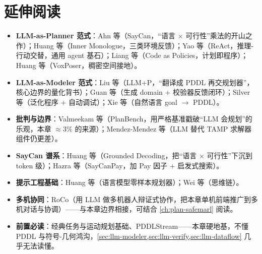 \section*{延伸阅读}
\label{sec:llm-further}

\begin{itemize}
  \item \textbf{LLM-as-Planner 范式}：Ahn 等\cite{ahn2022saycan}（SayCan，“语言 $\times$ 可行性”乘法的开山之作）；Huang 等\cite{huang2022innermonologue}（Inner Monologue，三类环境反馈）；Yao 等\cite{yao2023react}（ReAct，推理-行动交替，通用 agent 基石）；Liang 等\cite{liang2023codeaspolicies}（Code as Policies，计划即程序）；Huang 等\cite{huang2023voxposer}（VoxPoser，稠密空间接地）。
  \item \textbf{LLM-as-Modeler 范式}：Liu 等\cite{liu2023llmp}（LLM+P，“翻译成 PDDL 再交规划器”，核心边界的量化背书）；Guan 等\cite{guan2023worldmodel}（生成 domain $+$ 校验器反馈闭环）；Silver 等\cite{silver2024generalized}（泛化程序 $+$ 自动调试）；Xie 等\cite{xie2023translating}（自然语言 goal $\to$ PDDL）。
  \item \textbf{批判与边界}：Valmeekam 等\cite{valmeekam2023planbench}（PlanBench，用严格基准戳破“LLM 会规划”的乐观，本章 $\approx 3\%$ 的来源）；Mendez-Mendez 等\cite{mendezmendez2025llmtamp}（LLM 替代 TAMP 求解器组件仍更差）。
  \item \textbf{SayCan 谱系}：Huang 等\cite{huang2023grounded}（Grounded Decoding，把“语言 $\times$ 可行性”下沉到 token 级）；Hazra 等\cite{hazra2024saycanpay}（SayCanPay，加 Pay 因子 $+$ 启发式搜索）。
  \item \textbf{提示工程基础}：Huang 等\cite{huang2022zeroshot}（语言模型零样本规划器）；Wei 等\cite{wei2022cot}（思维链）。
  \item \textbf{多机协同}：RoCo\cite{mandi2024roco}（用 LLM 做多机器人辩证式协作，把本章单机前端推广到多机对话与协调）——与本章边界相接，可结合 \cref{ch:plan-safemarl} 阅读。
  \item \textbf{前置必读}：经典任务与运动规划基础、PDDLStream——本章硬地基，不懂 PDDL 与符号-几何鸿沟，\cref{sec:llm-modeler,sec:llm-verify,sec:llm-dataflow} 几乎无法读懂。
\end{itemize}
